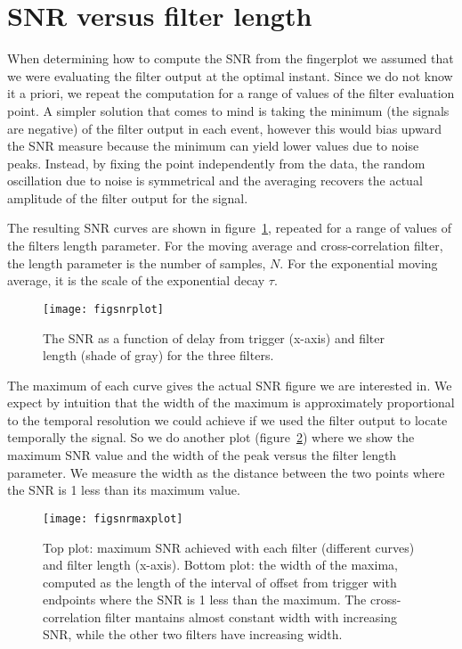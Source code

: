 \section{SNR versus filter length}

When determining how to compute the SNR from the fingerplot we assumed that we
were evaluating the filter output at the optimal instant. Since we do not know
it a priori, we repeat the computation for a range of values of the filter
evaluation point. A simpler solution that comes to mind is taking the minimum
(the signals are negative) of the filter output in each event, however this
would bias upward the SNR measure because the minimum can yield lower values
due to noise peaks. Instead, by fixing the point independently from the data,
the random oscillation due to noise is symmetrical and the averaging recovers
the actual amplitude of the filter output for the signal.

The resulting SNR curves are shown in figure~\ref{fig:snrplot}, repeated for a
range of values of the filters length parameter. For the moving average and
cross-correlation filter, the length parameter is the number of samples, $N$.
For the exponential moving average, it is the scale of the exponential decay
$\tau$.

\begin{figure}
    \hspace{-0.26\textwidth}
    \texttt{[image: figsnrplot]}
    
    \caption{The SNR as a function of delay from trigger (x-axis) and filter
    length (shade of gray) for the three filters.}
    
    \label{fig:snrplot}
\end{figure}

The maximum of each curve gives the actual SNR figure we are interested in. We
expect by intuition that the width of the maximum is approximately proportional
to the temporal resolution we could achieve if we used the filter output to
locate temporally the signal. So we do another plot
(figure~\ref{fig:snrmaxplot}) where we show the maximum SNR value and the width
of the peak versus the filter length parameter. We measure the width as the
distance between the two points where the SNR is 1 less than its maximum value.


\begin{figure}
    \hspace{0.00\textwidth}
    \texttt{[image: figsnrmaxplot]}
    
    \caption{Top plot: maximum SNR achieved with each filter (different curves)
    and filter length (x-axis). Bottom plot: the width of the maxima, computed
    as the length of the interval of offset from trigger with endpoints where
    the SNR is 1 less than the maximum. The cross-correlation filter mantains
    almost constant width with increasing SNR, while the other two filters
    have increasing width.}
    
    \label{fig:snrmaxplot}
\end{figure}

